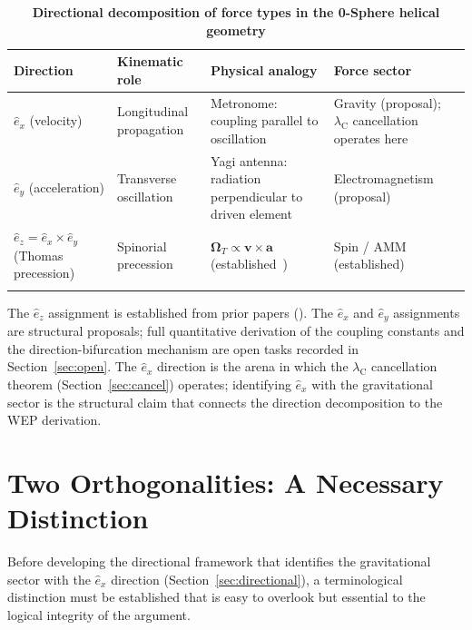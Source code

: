\documentclass[%
 reprint, amsmath,amssymb, aps, prb, ]{revtex4-2}
\numberwithin{equation}{section}
\newcommand{\lambdaC}{\lambda_{\mathrm{C}}}
\newcommand{\OmT}{\boldsymbol{\Omega}_T}
\newcommand{\ehat}[1]{\hat{e}_{#1}}
\begin{document}
\begin{table}[t!]
\centering
\caption{\textbf{Directional decomposition of force types in the 0-Sphere helical geometry}}
\label{tab:directional}
\renewcommand{\arraystretch}{1.4}
\begin{tabular}{p{3.5cm}p{3.5cm}p{4.5cm}p{4.0cm}}
\toprule
\textbf{Direction} & \textbf{Kinematic role} & \textbf{Physical analogy} & \textbf{Force sector} \\
\midrule
$\ehat{x}$ (velocity)
& Longitudinal propagation
& Metronome: coupling parallel to oscillation~\cite{hanamura34}
& Gravity (proposal); $\lambdaC$ cancellation operates here \\
\addlinespace[0.3cm]
$\ehat{y}$ (acceleration)
& Transverse oscillation
& Yagi antenna: radiation perpendicular to driven element
& Electromagnetism (proposal) \\
\addlinespace[0.3cm]
$\ehat{z} = \ehat{x}\times\ehat{y}$ (Thomas precession)
& Spinorial precession
& $\OmT \propto \mathbf{v}\times\mathbf{a}$ (established~\cite{hanamura19})
& Spin / AMM (established) \\
\addlinespace[0.2cm]
\bottomrule
\end{tabular}
\vspace{0.2cm}
\begin{minipage}{0.95\textwidth}
\justifying\footnotesize
The $\ehat{z}$ assignment is established from prior papers (\cite{hanamura19,hanamura47,hanamura48}). The $\ehat{x}$ and $\ehat{y}$ assignments are structural proposals; full quantitative derivation of the coupling constants and the direction-bifurcation mechanism are open tasks recorded in Section~\ref{sec:open}. The $\ehat{x}$ direction is the arena in which the $\lambdaC$ cancellation theorem (Section~\ref{sec:cancel}) operates; identifying $\ehat{x}$ with the gravitational sector is the structural claim that connects the direction decomposition to the WEP derivation.
\end{minipage}
\end{table}

\section{Two Orthogonalities: A Necessary Distinction}
\label{sec:orthogonality}

Before developing the directional framework that identifies the gravitational sector with the $\ehat{x}$ direction (Section~\ref{sec:directional}), a terminological distinction must be established that is easy to overlook but essential to the logical integrity of the argument.
\end{document}
